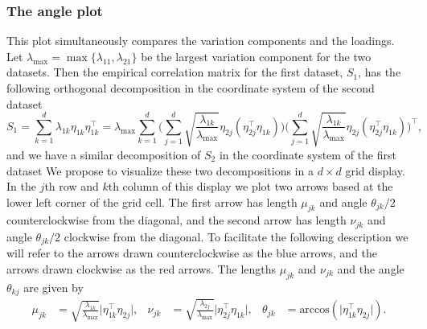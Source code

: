 \documentclass[titlepage,11pt,twoside]{article}
\newcommand{\hl}[1]{\textcolor{magenta}{#1}}
\newcommand{\acos}{\text{arccos}}
\begin{document}
\subsubsection{The angle plot}
This plot simultaneously compares the variation components and the loadings. Let $\lambda_{\max} = \max\{ \lambda_{11}, \lambda_{21} \}$ be the largest variation component for the two datasets. Then the empirical correlation matrix for the first dataset, $S_1$, has the following orthogonal decomposition in the coordinate system of the second dataset
\begin{equation*}
S_1 = \sum_{k=1}^d \lambda_{1k} \eta_{1k} \eta_{1k}^\top
= \lambda_{\max} \sum_{k=1}^d
\Bigg( \sum_{j=1}^d \sqrt{\frac{\lambda_{1k}}{\lambda_{\max}}} \eta_{2j} (\eta_{2j}^\top \eta_{1k}) \Bigg)
\Bigg( \sum_{j=1}^d \sqrt{\frac{\lambda_{1k}}{\lambda_{\max}}} \eta_{2j} (\eta_{2j}^\top \eta_{1k}) \Bigg)^\top,
\end{equation*}
and we have a similar decomposition of $S_2$ in the coordinate system of the first dataset %
We propose to visualize these two decompositions in a $d \times d$ grid display. In the $j$th row and $k$th column of this display we plot two arrows based at the lower left corner of the grid cell. The first arrow has length $\mu_{jk}$ and angle $\theta_{jk}/2$ counterclockwise from the diagonal, and the second arrow has length $\nu_{jk}$ and angle $\theta_{jk}/2$ clockwise from the diagonal. To facilitate the following description we will refer to the arrows drawn counterclockwise as the blue arrows, and the arrows drawn clockwise as the red arrows. The lengths $\mu_{jk}$ and $\nu_{jk}$ and the angle $\theta_{kj}$ are given by
\begin{align*}
\mu_{jk} &= \sqrt{\frac{\lambda_{1k}}{\lambda_{\max}}} \lvert \eta_{1k}^\top \eta_{2j} \rvert, &
\nu_{jk} &= \sqrt{\frac{\lambda_{2j}}{\lambda_{\max}}} \lvert \eta_{2j}^\top \eta_{1k} \rvert, &
\theta_{jk} &= \acos(\lvert \eta_{1k}^\top \eta_{2j} \rvert).
\end{align*}
\end{document}
